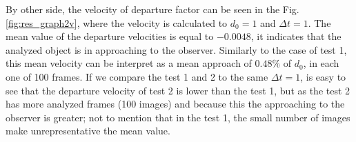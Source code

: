 By other side, the velocity of departure factor can be seen in the 
Fig. \ref{fig:res_graph2v}, where the velocity is calculated
to $d_0=1$ and $\Delta t=1$. The mean value of the departure
velocities is equal to $-0.0048$, it indicates that the
analyzed object is in approaching to the observer. Similarly
to the case of test 1, this mean velocity can be interpret
as a mean approach of $0.48\%$ of $d_0$, in each one of 100 frames.
If we compare the test 1 and 2 to the same $\Delta t=1$, is easy to see
that the departure velocity of test 2  is lower than the test 1, 
but as the test 2 has more analyzed frames (100 images)
and because this the approaching to the observer is greater; 
not to mention that in the test 1, the small number of images 
make  unrepresentative the mean value.




